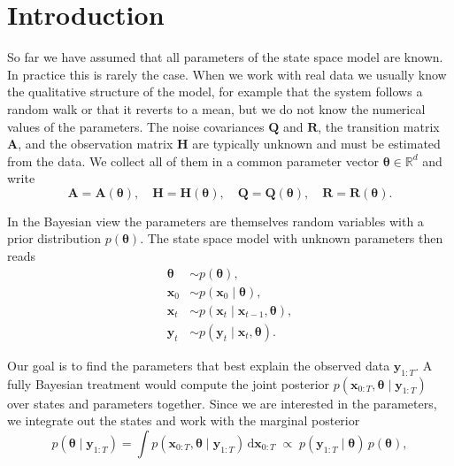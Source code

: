\section{Introduction}
So far we have assumed that all parameters of the state space model are known. In practice this is rarely the case. When we work with real data we usually know the qualitative structure of the model, for example that the system follows a random walk or that it reverts to a mean, but we do not know the numerical values of the parameters. The noise covariances $\mathbf{Q}$ and $\mathbf{R}$, the transition matrix $\mathbf{A}$, and the observation matrix $\mathbf{H}$ are typically unknown and must be estimated from the data. We collect all of them in a common parameter vector $\boldsymbol{\theta} \in \mathbb{R}^{d}$ and write
\begin{equation}
    \mathbf{A} = \mathbf{A}(\boldsymbol{\theta}), \quad
    \mathbf{H} = \mathbf{H}(\boldsymbol{\theta}), \quad
    \mathbf{Q} = \mathbf{Q}(\boldsymbol{\theta}), \quad
    \mathbf{R} = \mathbf{R}(\boldsymbol{\theta}).
\end{equation}

In the Bayesian view the parameters are themselves random variables with a prior distribution $p(\boldsymbol{\theta})$. The state space model with unknown parameters then reads \cite[Ch.~12]{sarkka:bayesian_filtering}
\begin{align}
    \boldsymbol{\theta} &\sim p(\boldsymbol{\theta}), \\
    \mathbf{x}_0 &\sim p(\mathbf{x}_0 \mid \boldsymbol{\theta}), \\
    \mathbf{x}_t &\sim p(\mathbf{x}_t \mid \mathbf{x}_{t-1}, \boldsymbol{\theta}), \\
    \mathbf{y}_t &\sim p(\mathbf{y}_t \mid \mathbf{x}_t, \boldsymbol{\theta}).
\end{align}

Our goal is to find the parameters that best explain the observed data $\mathbf{y}_{1:T}$. A fully Bayesian treatment would compute the joint posterior $p(\mathbf{x}_{0:T}, \boldsymbol{\theta} \mid \mathbf{y}_{1:T})$ over states and parameters together. Since we are interested in the parameters, we integrate out the states and work with the marginal posterior
\begin{equation}\label{eq:marginal_posterior}
    p(\boldsymbol{\theta} \mid \mathbf{y}_{1:T})
    = \int p(\mathbf{x}_{0:T}, \boldsymbol{\theta} \mid \mathbf{y}_{1:T}) \, \mathrm{d}\mathbf{x}_{0:T}
    \;\propto\; p(\mathbf{y}_{1:T} \mid \boldsymbol{\theta})\, p(\boldsymbol{\theta}),
\end{equation}

